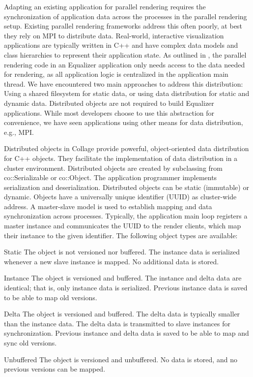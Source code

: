 Adapting an existing application for parallel rendering requires the
synchronization of application data across the processes in the parallel
rendering setup. Existing parallel rendering frameworks address this often
poorly, at best they rely on MPI to distribute data. Real-world, interactive
visualization applications are typically written in C++ and have complex data
models and class hierarchies to represent their application state. As outlined
in \cite{EMP:09}, the parallel rendering code in an \textsf{Equalizer}
application only needs access to the data needed for rendering, as all
application logic is centralized in the application main thread. We have
encountered two main approaches to address this distribution: Using a shared
filesystem for static data, or using data distribution for static and dynamic
data. Distributed objects are not required to build \textsf{Equalizer}
applications. While most developers choose to use this abstraction for
convenience, we have seen applications using other means for data distribution,
e.g., MPI.

Distributed objects in \textsf{Collage} provide powerful, object-oriented data
distribution for C++ objects. They facilitate the implementation of data
distribution in a cluster environment. Distributed objects are created by
subclassing from \textsf{co::Serializable} or \textsf{co::Object}. The
application programmer implements serialization and deserialization. Distributed
objects can be static (immutable) or dynamic. Objects have a universally unique
identifier (UUID) as cluster-wide address. A master-slave model is used to
establish mapping and data synchronization across processes. Typically, the
application main loop registers a master instance and communicates the UUID to
the render clients, which map their instance to the given identifier. The
following object types are available:

\begin{compactdesc}
\item[Static] The object is not versioned nor buffered. The instance data is
  serialized whenever a new slave instance is mapped. No additional data is
  stored.
\item[Instance] The object is versioned and buffered. The instance and delta
  data are identical; that is, only instance data is serialized. Previous
  instance data is saved to be able to map old versions.
\item[Delta] The object is versioned and buffered. The delta data is typically
  smaller than the instance data. The delta data is transmitted to slave
  instances for synchronization. Previous instance and delta data is saved to be
  able to map and sync old versions.
\item[Unbuffered] The object is versioned and unbuffered. No data is stored, and
  no previous versions can be mapped.
\end{compactdesc}


